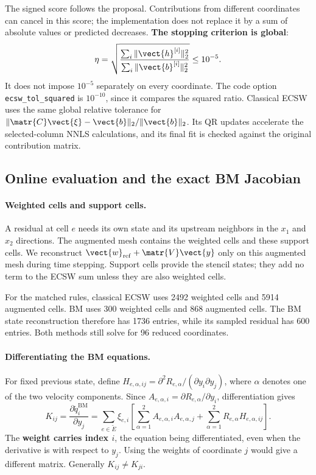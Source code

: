 The signed score follows the proposal. Contributions from different coordinates can cancel in this score; the implementation does not replace it by a sum of absolute values or predicted decreases. \textbf{The stopping criterion is global}:
\begin{equation}
 \eta=\sqrt{\frac{\sum_i\|\vect{h}^{[i]}\|_2^2}{\sum_i\|\vect{b}^{[i]}\|_2^2}}
 \leq10^{-5}.
 \label{eq:impl-tolerance}
\end{equation}
It does not impose $10^{-5}$ separately on every coordinate. The code option \texttt{ecsw\_tol\_squared} is $10^{-10}$, since it compares the squared ratio. Classical ECSW uses the same global relative tolerance for $\|\matr{C}\vect{\xi}-\vect{b}\|_2/\|\vect{b}\|_2$. Its QR updates accelerate the selected-column NNLS calculations, and its final fit is checked against the original contribution matrix.

\subsection{Online evaluation and the exact BM Jacobian}
\label{sec:impl-online}

\paragraph{Weighted cells and support cells.}
A residual at cell $e$ needs its own state and its upstream neighbors in the $x_1$ and $x_2$ directions. The augmented mesh contains the weighted cells and these support cells. We reconstruct $\vect{w}_{\mathrm{ref}}+\matr{V}\vect{y}$ only on this augmented mesh during time stepping. Support cells provide the stencil states; they add no term to the ECSW sum unless they are also weighted cells.

For the matched rules, classical ECSW uses 2492 weighted cells and 5914 augmented cells. BM uses 300 weighted cells and 868 augmented cells. The BM state reconstruction therefore has 1736 entries, while its sampled residual has 600 entries. Both methods still solve for 96 reduced coordinates.

\paragraph{Differentiating the BM equations.}
For fixed previous state, define $H_{e,\alpha,ij}=\partial^2R_{e,\alpha}/(\partial y_i\partial y_j)$, where $\alpha$ denotes one of the two velocity components. Since $A_{e,\alpha,i}=\partial R_{e,\alpha}/\partial y_i$, differentiation gives
\begin{equation}
 K_{ij}=\frac{\partial\widetilde q_i^{\mathrm{BM}}}{\partial y_j}
 =\sum_{e\in\widetilde E}\xi_{e,i}
 \left[\sum_{\alpha=1}^2 A_{e,\alpha,i}A_{e,\alpha,j}
       +\sum_{\alpha=1}^2R_{e,\alpha}H_{e,\alpha,ij}\right].
 \label{eq:impl-K}
\end{equation}
The \textbf{weight carries index $i$}, the equation being differentiated, even when the derivative is with respect to $y_j$. Using the weights of coordinate $j$ would give a different matrix. Generally $K_{ij}\ne K_{ji}$.

